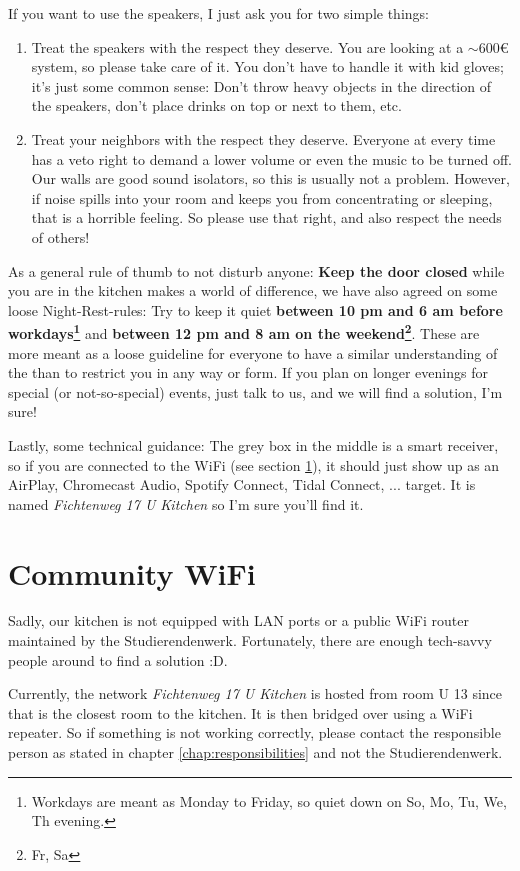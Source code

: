 If you want to use the speakers, I just ask you for two simple things:
\begin{enumerate}
    \item Treat the speakers with the respect they deserve. You are looking at a $\sim$600€ system, so please take care of it. You don't have to handle it with kid gloves; it's just some common sense: Don't throw heavy objects in the direction of the speakers, don't place drinks on top or next to them, etc.
    \item Treat your neighbors with the respect they deserve. Everyone at every time has a veto right to demand a lower volume or even the music to be turned off. Our walls are good sound isolators, so this is usually not a problem. However, if noise spills into your room and keeps you from concentrating or sleeping, that is a horrible feeling. So please use that right, and also respect the needs of others!
\end{enumerate}

As a general rule of thumb to not disturb anyone: \textbf{Keep the door closed} while you are in the kitchen makes a world of difference, we have also agreed on some loose Night-Rest-rules: Try to keep it quiet \textbf{between 10 pm and 6 am before workdays\footnote{Workdays are meant as Monday to Friday, so quiet down on So, Mo, Tu, We, Th evening.}} and \textbf{between 12 pm and 8 am on the weekend\footnote{Fr, Sa}}. These  are more meant as a loose guideline for everyone to have a similar understanding of the  than to restrict you in any way or form. If you plan on longer evenings for special (or not-so-special) events, just talk to us, and we will find a solution, I'm sure!

Lastly, some technical guidance: The grey box in the middle is a smart receiver, so if you are connected to the WiFi (see section \ref{sec:wifi}), it should just show up as an AirPlay, Chromecast Audio, Spotify Connect, Tidal Connect, ... target. It is named \textit{Fichtenweg 17 U Kitchen} so I'm sure you'll find it.

\section{Community WiFi} \label{sec:wifi}
Sadly, our kitchen is not equipped with LAN ports or a public WiFi router maintained by the Studierendenwerk. Fortunately, there are enough tech-savvy people around to find a solution :D.

Currently, the network \textit{Fichtenweg 17 U Kitchen} is hosted from room U 13 since that is the closest room to the kitchen. It is then bridged over using a WiFi repeater. So if something is not working correctly, please contact the responsible person as stated in chapter \ref{chap:responsibilities} and not the Studierendenwerk.


